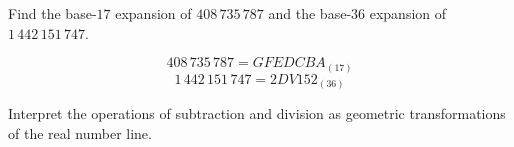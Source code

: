 
\begin{exercise}
Find the base-$17$ expansion of $408\,735\,787$ and the base-$36$ expansion of $1\,442\,151\,747$.
\end{exercise}

\begin{solution}
\[408\,735\,787 = GFEDCBA_{(17)}\]
\[1\,442\,151\,747 = 2DV152_{(36)}\]
\end{solution}


\begin{exercise}
Interpret the operations of subtraction and division as geometric transformations of the real number line.
\end{exercise}

